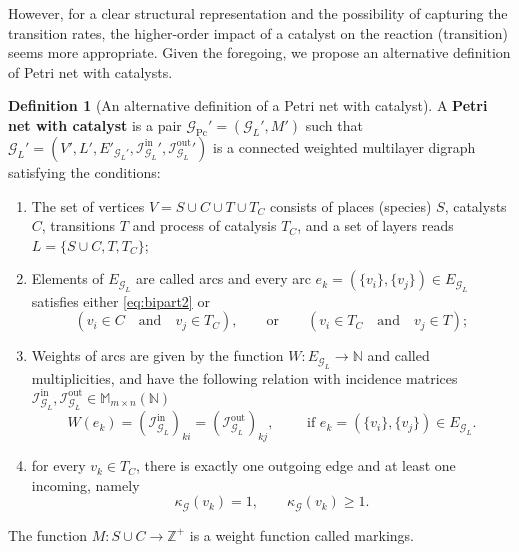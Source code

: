 \documentclass[a4paper,12pt]{article}
\theoremstyle{definition}
\newtheorem{definition}{Definition}
\theoremstyle{remark}
\newcommand{\mG}{\mathcal{G}}
\newcommand{\tin}{\mathrm{in}}
\newcommand{\out}{\mathrm{out}}
\newcommand{\inci}{\mathcal{I}^{\tin}}
\newcommand{\inco}{\mathcal{I}^{\out}}
\begin{document}
However, for a clear structural representation and the possibility of capturing the transition rates, the higher-order impact of a catalyst on the reaction (transition) seems more appropriate. Given the foregoing, we propose an alternative definition of Petri net with catalysts. 
\begin{definition}[An alternative definition of a Petri net with catalyst]\label{def:Petr&catal2}
    A \textbf{ Petri net with catalyst} is a pair $\mathcal{G}_{\textrm{Pc}}'=(\mathcal{G}_L',M')$ such that $\mathcal{G}_L'=(V',L',E'_{\mathcal{G}_L'}, {\inci_{\mG_L}}',{\inco_{\mG_L}}')$ is a connected weighted multilayer digraph satisfying the conditions:
    \begin{enumerate}
  \item The set of vertices $V=S\cup C\cup T \cup T_C$ consists of places (species) $S$, catalysts $C$, transitions $T$ and process of catalysis $T_C$, and a set of layers reads $L=\{S\cup C,T,T_C\}$;
    \item  Elements of $E_{\mG_L}$ are called arcs and every arc $e_{k}=(\{v_i\},\{v_j\})\in E_{\mG_L}$ satisfies either \ref{eq:bipart2} or 
     \begin{equation}\label{eq:bipart3}
    (v_i\in C \quad \textrm{and}\quad v_j\in T_C),\qquad \textrm{or}\qquad (v_i\in T_C \quad \textrm{and}\quad v_j\in T);
    \end{equation}
    
    \item  Weights of arcs are given by the function $W:E_{\mG_L}\to \mathbb{N}$ and called multiplicities, and have the following relation with incidence matrices  $\inci_{\mG_L},\inco_{\mG_L}\in \mathbb{M}_{m\times n}(\mathbb{N})$
    \begin{equation*}
W(e_k)=\left(\inci_{\mG_L}\right)_{ki}=\left(\inco_{\mG_L}\right)_{kj},\qquad \textrm{ if }e_k=(\{v_i\},\{v_j\})\in E_{\mG_L}.
    \end{equation*}
    \item for every $v_k\in T_C$, there is exactly one outgoing edge and at least one incoming, namely  
    \begin{equation*}
   \kappa_{\mG}(v_k)=1,\qquad \kappa_{\mG}(v_k)\geq 1.
    \end{equation*}
    \end{enumerate}
     The function $M: S \cup C\rightarrow \mathbb{Z}^{+}$ is a weight function called markings.
\end{definition}
\end{document}
